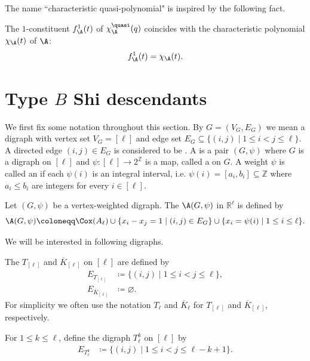 The name ``characteristic quasi-polynomial" is inspired by the following fact.


\begin{theorem}
\label{thm:KTT11} 
The $1$-constituent $f^1_{\A}(t)$ of $\chi^{\quasi}_{\A}(q)$ coincides with the characteristic polynomial $\chi_\A( t)$ of $\A$: 	
$$f^1_{\A}(t)=\chi_{\A}(t).$$
\end{theorem}




\section{Type \texorpdfstring{$B$}{B} Shi descendants}
\label{sec:F-SS-BSI}
\quad
We first fix some notation throughout this section. 
By $ G = (V_{G}, E_{G}) $ we mean a digraph  with vertex set $ V_{G} = [\ell]$ and edge set $E_G \subseteq \{(i,j) \mid 1 \leq i < j \leq \ell\}$. 
A directed edge $(i,j) \in E_{G}$ is considered to be .
A   is a pair  $(G,\psi)$ where $G$ is a digraph on $ [\ell]$ and $ \psi \colon [\ell] \to 2^{\mathbb{Z}} $ is a map, called a  on $G$. 
A weight   $ \psi$ is called an  if each $\psi(i)$  is an integral interval, i.e. $ \psi(i) = [a_{i}, b_{i}]\subseteq \mathbb{Z}$ where $a_{i}\le b_{i}$ are integers for every $ i \in [\ell] $. 


\begin{definition}
\label{def:A-psi-digraphic}
Let $(G,\psi)$ be a vertex-weighted digraph.
The  $ \A(G,\psi) $ in $ \mathbb{R}^{\ell} $ is defined by 
$$
\A(G,\psi)  \coloneqq 
\Cox(A_\ell) 
\cup \{ x_{i}-x_{j}=1  \mid (i,j) \in E_{G}\}
\cup \{  x_{i}=\psi(i) \mid 1 \leq i   \leq \ell\}.
$$
\end{definition}

We will be interested in following digraphs.
\begin{definition}
\label{def:digraphs}
The  $  T_{[\ell]}$ and  $ \overline{K}_{[\ell]}$ on $ [\ell]$ are defined by 
\begin{align*}
E_{T_{[\ell]}} & \coloneqq  \{(i,j) \mid 1 \leq i < j \leq \ell\},\\
E_{\overline{K}_{[\ell]}} & \coloneqq  \varnothing.
\end{align*}
For simplicity we often use the notation $T_{\ell}$ and $ \overline{K}_{\ell}$ for $  T_{[\ell]} $ and $ \overline{K}_{[\ell]}$, respectively. 

For $1 \leq   k \leq \ell$, define the digraph  $ T_{\ell}^{k}$  on $ [\ell] $ by 
\begin{align*} 
E_{T_{\ell}^{k}} &  \coloneqq \{(i,j) \mid 1 \leq i < j \leq \ell - k + 1\}.
\end{align*}
\end{definition}

